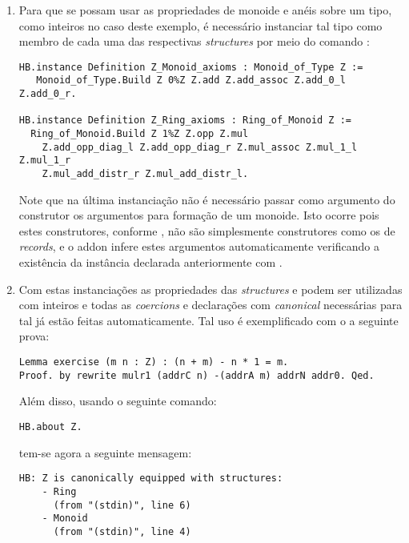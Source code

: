 {{\begin{enumerate}
        \item \label{item:inst} Para que se possam usar as propriedades de monoide e anéis sobre um tipo, como inteiros no caso deste exemplo, é necessário instanciar tal tipo como membro de cada uma das respectivas \textit{structures} por meio do comando  \cite{cohen:hal-02478907}:
            \begin{lstlisting}[language=coq, frame=single, tabsize=1]
HB.instance Definition Z_Monoid_axioms : Monoid_of_Type Z :=
   Monoid_of_Type.Build Z 0%Z Z.add Z.add_assoc Z.add_0_l Z.add_0_r.

HB.instance Definition Z_Ring_axioms : Ring_of_Monoid Z :=
  Ring_of_Monoid.Build Z 1%Z Z.opp Z.mul
    Z.add_opp_diag_l Z.add_opp_diag_r Z.mul_assoc Z.mul_1_l Z.mul_1_r
    Z.mul_add_distr_r Z.mul_add_distr_l.
            \end{lstlisting}

        Note que na última instanciação não é necessário passar como argumento do construtor os argumentos para formação de um monoide. Isto ocorre pois estes construtores, conforme \cite{cohen:hal-02478907}, não são simplesmente construtores como os de \textit{records}, e o addon  infere estes argumentos automaticamente verificando a existência da instância declarada anteriormente com .

        \item Com estas instanciações as propriedades das \textit{structures}  e  podem ser utilizadas com inteiros e todas as \textit{coercions} e declarações com \textit{canonical} necessárias para tal já estão feitas automaticamente. Tal uso é exemplificado com o a seguinte prova:
            \begin{lstlisting}[language=coq, frame=single, tabsize=1]
Lemma exercise (m n : Z) : (n + m) - n * 1 = m.
Proof. by rewrite mulr1 (addrC n) -(addrA m) addrN addr0. Qed.
            \end{lstlisting}

        Além disso, usando o seguinte comando:
            \begin{lstlisting}[language=coq, frame=single, tabsize=1]
HB.about Z.
            \end{lstlisting}

        tem-se agora a seguinte mensagem:
            \begin{lstlisting}[language=coq-error, frame=single, tabsize=1]
HB: Z is canonically equipped with structures:
    - Ring
      (from "(stdin)", line 6)
    - Monoid
      (from "(stdin)", line 4)
            \end{lstlisting}


\end{enumerate}}}

